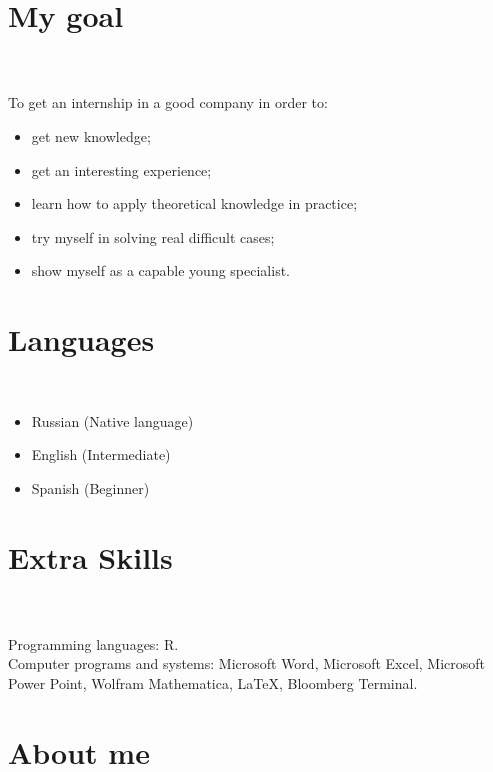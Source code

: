 \documentclass[letterpaper]{twentysecondcv} %
\begin{document}

\section{My goal}\\
\\
To get an internship in a good company in order to: 
\begin{itemize}
\item get new knowledge;
\item get an interesting experience;
\item learn how to apply theoretical knowledge in practice;
\item try myself in solving real difficult cases;
\item show myself as a capable young specialist.
\end{itemize}

\section{Languages} \\
\begin{itemize}
\item Russian (Native language)
\item English (Intermediate)
\item Spanish (Beginner) 
\end{itemize}

\section{Extra Skills}\\
\\
Programming languages: R.\\
Computer programs and systems: Microsoft Word, Microsoft Excel, Microsoft Power Point, Wolfram Mathematica, LaTeX, Bloomberg Terminal.
 
\section{About me}
\\

\end{document}
